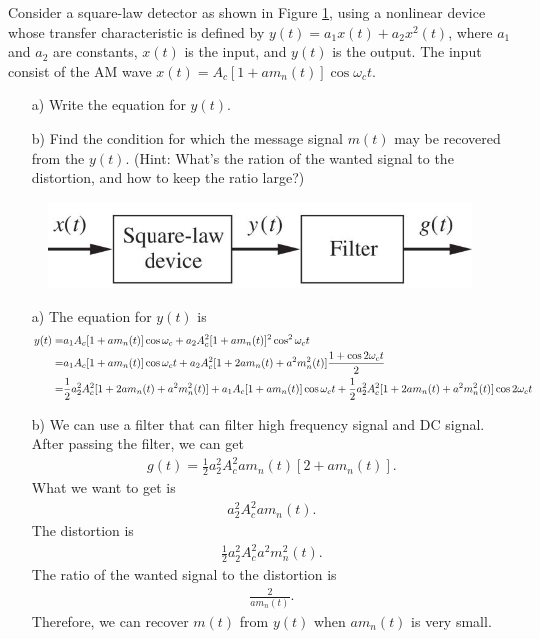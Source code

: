 \documentclass{assignment}
\begin{document}
\begin{prob}
    Consider a square-law detector as shown in Figure \ref{Assignment-4-Problem-5}, using a nonlinear device whose transfer characteristic is defined by $y(t)=a_1x(t)+a_2x^2(t)$, where $a_1$ and $a_2$ are constants, $x(t)$ is the input, and $y(t)$ is the output. The input consist of the AM wave $x(t)=A_c[1+am_n(t)]\cos\omega_ct$.
    \begin{itemize}
        \item[a)] Write the equation for $y(t)$.
        \item[b)] Find the condition for which the message signal $m(t)$ may be recovered from the $y(t)$. (Hint: What's the ration of the wanted signal to the distortion, and how to keep the ratio large?)
    \end{itemize}
    \begin{figure}[h]
        \centering
        \includegraphics[width=.5\columnwidth]{Assignment-4-Problem-5.jpg}
        \caption{}
        \label{Assignment-4-Problem-5}
    \end{figure}
\end{prob}
\begin{sol}
    \begin{itemize}
        \item[a)] The equation for $y(t)$ is
        \begin{align}
            \notag y(t)=&a_1A_c[1+am_n(t)]\cos\omega_c+a_2A_c^2[1+am_n(t)]^2\cos^2\omega_ct\\
            \notag=&a_1A_c[1+am_n(t)]\cos\omega_ct+a_2A_c^2[1+2am_n(t)+a^2m_n^2(t)]\frac{1+\cos 2\omega_ct}{2}\\
            =&\frac{1}{2}a_2^2A_c^2[1+2am_n(t)+a^2m_n^2(t)]+a_1A_c[1+am_n(t)]\cos\omega_ct+\frac{1}{2}a_2^2A_c^2[1+2am_n(t)+a^2m_n^2(t)]\cos 2\omega_ct
        \end{align}
        \item[b)] We can use a filter that can filter high frequency signal and DC signal. After passing the filter, we can get
        \begin{align}
            g(t)=\frac{1}{2}a_2^2A_c^2am_n(t)[2+am_n(t)].
        \end{align}
        What we want to get is
        \begin{align}
            a_2^2A_c^2am_n(t).
        \end{align}
        The distortion is
        \begin{align}
            \frac{1}{2}a_2^2A_c^2a^2m_n^2(t).
        \end{align}
        The ratio of the wanted signal to the distortion is
        \begin{align}
            \frac{2}{am_n(t)}.
        \end{align}
        Therefore, we can recover $m(t)$ from $y(t)$ when $am_n(t)$ is very small.
    \end{itemize}
\end{sol}
\end{document}
